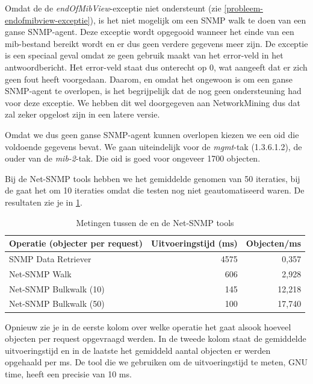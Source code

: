 Omdat de \nwmretriever{} de \textit{endOfMibView}-exceptie niet ondersteunt (zie \cref{probleem-endofmibview-exceptie}),
is het niet mogelijk om een SNMP walk te doen van een ganse SNMP-agent.
Deze exceptie wordt opgegooid wanneer het einde van een \gls{mib}-bestand bereikt wordt en er dus geen verdere gegevens meer zijn.
De exceptie is een speciaal geval omdat ze geen gebruik maakt van het error-veld in het antwoordbericht.
Het error-veld staat dus onterecht op 0, wat aangeeft dat er zich geen fout heeft voorgedaan.
Daarom, en omdat het ongewoon is om een ganse SNMP-agent te overlopen, is het begrijpelijk dat de \nwmretriever nog geen ondersteuning had voor deze exceptie.
We hebben dit wel doorgegeven aan NetworkMining dus dat zal zeker opgelost zijn in een latere versie.

Omdat we dus geen ganse SNMP-agent kunnen overlopen kiezen we een \gls{oid} die voldoende gegevens bevat.
We gaan uiteindelijk voor de \textit{mgmt}-tak (1.3.6.1.2), de ouder van de \textit{mib-2}-tak.
Die \gls{oid} is goed voor ongeveer 1700 objecten.

Bij de Net-SNMP tools hebben we het gemiddelde genomen van 50 iteraties,
bij de \nwmretriever{} gaat het om 10 iteraties omdat die testen nog niet geautomatiseerd waren.
De resultaten zie je in \cref{tabel-nwmretriever-vs-net-snmp}.

\begin{table}[h]
\centering
\begin{tabular}{@{}lrr@{}}
\toprule
Operatie (objecter per request) & Uitvoeringstijd (ms) & Objecten/ms \\ \midrule
SNMP Data Retriever             & 4575                 & 0,357       \\
Net-SNMP Walk                   & 606                  & 2,928       \\
Net-SNMP Bulkwalk (10)          & 145                  & 12,218      \\
Net-SNMP Bulkwalk (50)          & 100                  & 17,740      \\ \bottomrule
\end{tabular}
\caption{Metingen tussen de \nwmretriever{} en de Net-SNMP tools}
\label{tabel-nwmretriever-vs-net-snmp}
\end{table}

Opnieuw zie je in de eerste kolom over welke operatie het gaat alsook hoeveel objecten per request opgevraagd werden.
In de tweede kolom staat de gemiddelde uitvoeringstijd en in de laatste het gemiddeld aantal objecten er werden opgehaald per ms.
De tool die we gebruiken om de uitvoeringstijd te meten, GNU time, heeft een precisie van 10 ms.

